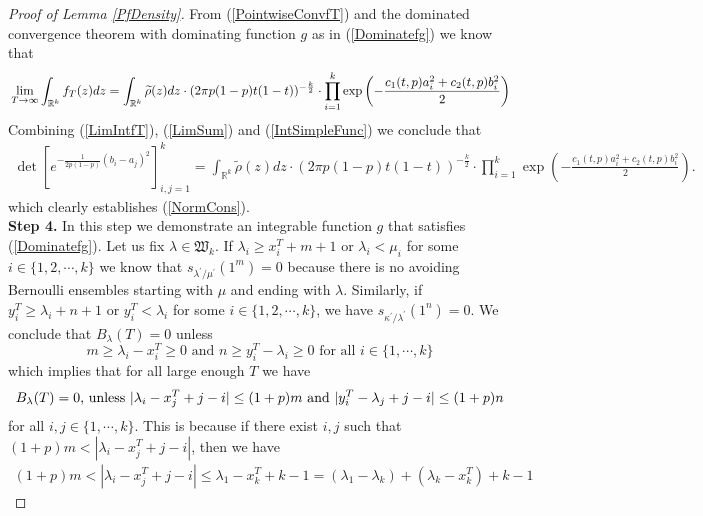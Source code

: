 \begin{proof}[Proof of Lemma \ref{PfDensity}]
From (\ref{PointwiseConvfT}) and the dominated convergence theorem with dominating function $g$ as in (\ref{Dominatefg}) we know that
\begin{equation}
	\begin{split}{\label{LimIntfT}}
	\lim_{T\rightarrow\infty}\int_{\mathbb{R}^{k}}f_T(z)dz=\int_{\mathbb{R}^k}\widetilde{\rho}(z)dz \cdot(2\pi p(1-p)t(1-t))^{-\frac{k}{2}}\cdot\prod_{i=1}^{k}\exp\left(-\frac{c_{1}(t,p)a_i^2+c_2(t,p)b_i^2}{2}\right)
\end{split}
\end{equation}
Combining (\ref{LimIntfT}), (\ref{LimSum}) and (\ref{IntSimpleFunc}) we conclude that
\begin{equation}
	\begin{split}
		\det\left[e^{-\frac{1}{2p(1-p)}(b_i-a_j)^2}\right]_{i,j=1}^{k}=\int_{\mathbb{R}^k}\widetilde{\rho}(z)dz\cdot(2\pi p(1-p)t(1-t))^{-\frac{k}{2}}\cdot\prod_{i=1}^{k}\exp\left(-\frac{c_1(t,p)a_i^2+c_2(t,p)b_i^2}{2}\right).
	\end{split}
\end{equation}
which clearly establishes (\ref{NormCons}).\\
\textbf{Step 4. }In this step we demonstrate an integrable function $g$ that satisfies (\ref{Dominatefg}). Let us fix $\lambda\in\mathfrak{W}_k$. If $\lambda_i\geq x_{i}^{T}+m+1$ or $\lambda_i<\mu_{i}$ for some $i\in\{1,2,\cdots,k\}$ we know that $s_{\lambda^{\prime}/\mu^{\prime}}(1^m)=0$ because there is no avoiding Bernoulli ensembles starting with $\mu$ and ending with $\lambda$. Similarly, if $y_{i}^T\geq \lambda_i+n+1$ or $y_{i}^T< \lambda_i$ for some $i\in\{1,2,\cdots,k\}$, we have $s_{\kappa^{\prime}/\lambda^{\prime}}(1^n)=0$. We conclude that $B_{\lambda}(T)=0$ unless
$$m\geq \lambda_i-x^{T}_i\geq 0\text{ and } n\geq y^{T}_i-\lambda_i\geq 0\text{ for all } i\in\{1,\cdots,k\}$$
which implies that for all large enough $T$ we have
\begin{equation}{\label{BLambda0unless}}
	\begin{split}
		B_{\lambda}(T)=0 \text{, unless }|\lambda_{i}-x_{j}^T+j-i|\leq (1+p)m \text{ and }|y_{i}^T-\lambda_{j}+j-i|\leq (1+p)n
	\end{split}
\end{equation}
for all $i,j\in\{1,\cdots, k\}$. This is because if there exist $i,j$ such that $(1+p)m<|\lambda_i-x^{T}_{j}+j-i|$, then we have 
\begin{equation*}
	\begin{split}
		(1+p)m<|\lambda_i-x^{T}_{j}+j-i|\leq \lambda_1-x^{T}_k+k-1=(\lambda_1-\lambda_k)+(\lambda_k-x^{T}_k)+k-1

\end{split}
\end{equation*}
\end{proof}
